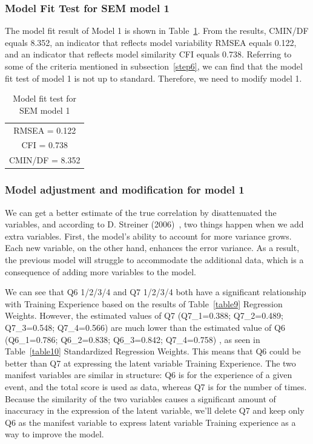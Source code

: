 \subsubsection{Model Fit Test for SEM model 1}
The model fit result of Model 1 is shown in Table~\ref{table15}. From the results, CMIN/DF equals 8.352, an indicator that reflects model variability RMSEA equals 0.122, and an indicator that reflects model similarity CFI equals 0.738. Referring to some of the criteria mentioned in subsection~\ref{step6}, we can find that the model fit test of model 1 is not up to standard. Therefore, we need to modify model 1.

\begin{table}[h]
  \caption{Model fit test for SEM model 1}
  \label{table15}
  \centering 
  \begin{tabular}{|c|}
  \hline
  RMSEA = 0.122 \\
  CFI = 0.738 \\
  CMIN/DF = 8.352 \\
  \hline
  \end{tabular}
\end{table}

\subsubsection{Model adjustment and modification for model 1 }

We can get a better estimate of the true correlation by disattenuated the variables, and according to D. Streiner (2006)~\cite{Streiner2006BuildingAB}, two things happen when we add extra variables. First, the model's ability to account for more variance grows. Each new variable, on the other hand, enhances the error variance. As a result, the previous model will struggle to accommodate the additional data, which is a consequence of adding more variables to the model. 

We can see that Q6 1/2/3/4 and Q7 1/2/3/4 both have a significant relationship with Training Experience based on the results of Table~\ref{table9} Regression Weights. However, the estimated values of Q7 (Q7\_1=0.388; Q7\_2=0.489; Q7\_3=0.548; Q7\_4=0.566) are much lower than the estimated value of Q6 (Q6\_1=0.786; Q6\_2=0.838; Q6\_3=0.842; Q7\_4=0.758) , as seen in Table~\ref{table10} Standardized Regression Weights. This means that Q6 could be better than Q7 at expressing the latent variable Training Experience. The two manifest variables are similar in structure: Q6 is for the experience of a given event, and the total score is used as data, whereas Q7 is for the number of times. Because the similarity of the two variables causes a significant amount of inaccuracy in the expression of the latent variable, we'll delete Q7 and keep only Q6 as the manifest variable to express latent variable Training experience as a way to improve the model. 

